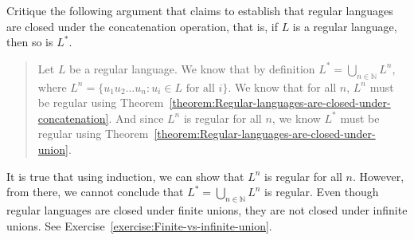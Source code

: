 \begin{flex}
\begin{exercise} \label{exercise:Regular-languages-are-closed-under-star}
Critique the following argument that claims to establish that regular languages are closed under the concatenation operation, that is, if $L$ is a regular language, then so is $L^*$.
\begin{quote}
Let $L$ be a regular language. We know that by definition $L^* = \bigcup_{n \in \mathbb{N}} L^n$, where $L^n = \{u_1 u_2 \ldots u_n : u_i \in L \text{ for all $i$} \}$. We know that for all $n$, $L^n$ must be regular using Theorem~\ref{theorem:Regular-languages-are-closed-under-concatenation}. And since $L^n$ is regular for all $n$, we know $L^*$ must be regular using Theorem~\ref{theorem:Regular-languages-are-closed-under-union}.
\end{quote}
\end{exercise}

\begin{solution}
It is true that using induction, we can show that $L^n$ is regular for all $n$. However, from there, we cannot conclude that $L^* = \bigcup_{n \in \mathbb{N}} L^n$ is regular. Even though regular languages are closed under finite unions, they are not closed under infinite unions. See Exercise~\ref{exercise:Finite-vs-infinite-union}.

\end{solution}
\end{flex}




